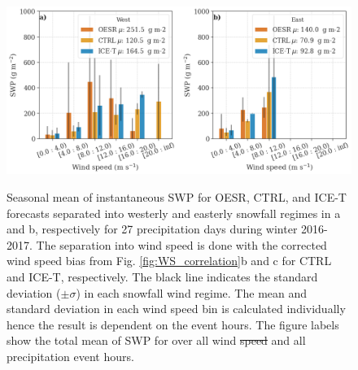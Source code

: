 \documentclass{ametsocV5}
\providecommand{\DIFadd}[1]{{\protect\color{blue}\uwave{#1}}} %
\providecommand{\DIFdel}[1]{{\protect\color{red}\sout{#1}}}                      %
\providecommand{\DIFaddbegin}{} %
\providecommand{\DIFaddend}{} %
\providecommand{\DIFaddFL}[1]{\DIFadd{#1}} %
\providecommand{\DIFdelFL}[1]{\DIFdel{#1}} %
\providecommand{\DIFaddbeginFL}{} %
\providecommand{\DIFaddendFL}{} %
\providecommand{\DIFdelbeginFL}{} %
\providecommand{\DIFdelendFL}{} %
\newcommand{\DIFscaledelfig}{0.5}
\newlength{\DIFdelgraphicswidth} %
\newlength{\DIFdelgraphicsheight} %
\newcommand{\DIFaddincludegraphics}[2][]{{\color{blue}\fbox{\DIFOincludegraphics[#1]{#2}}}} %
\newcommand{\DIFdelincludegraphics}[2][]{%
\sbox{\DIFdelgraphicsbox}{\DIFOincludegraphics[#1]{#2}}%
\settoboxwidth{\DIFdelgraphicswidth}{\DIFdelgraphicsbox} %
\settoboxtotalheight{\DIFdelgraphicsheight}{\DIFdelgraphicsbox} %
\scalebox{\DIFscaledelfig}{%
\parbox[b]{\DIFdelgraphicswidth}{\usebox{\DIFdelgraphicsbox}\\[-\baselineskip] \rule{\DIFdelgraphicswidth}{0em}}\llap{\resizebox{\DIFdelgraphicswidth}{\DIFdelgraphicsheight}{%
\setlength{\unitlength}{\DIFdelgraphicswidth}%
\begin{picture}(1,1)%
\thicklines\linethickness{2pt} %
{\color[rgb]{1,0,0}\put(0,0){\framebox(1,1){}}}%
{\color[rgb]{1,0,0}\put(0,0){\line( 1,1){1}}}%
{\color[rgb]{1,0,0}\put(0,1){\line(1,-1){1}}}%
\end{picture}%
}\hspace*{3pt}}} %
} %
\DeclareRobustCommand{\DIFaddbegin}{\DIFOaddbegin \let\includegraphics\DIFaddincludegraphics} %
\DeclareRobustCommand{\DIFaddend}{\DIFOaddend \let\includegraphics\DIFOincludegraphics} %
\DeclareRobustCommand{\DIFaddbeginFL}{\DIFOaddbeginFL \let\includegraphics\DIFaddincludegraphics} %
\DeclareRobustCommand{\DIFaddendFL}{\DIFOaddendFL \let\includegraphics\DIFOincludegraphics} %
\DeclareRobustCommand{\DIFdelbeginFL}{\DIFOdelbeginFL \let\includegraphics\DIFdelincludegraphics} %
\DeclareRobustCommand{\DIFdelendFL}{\DIFOaddendFL \let\includegraphics\DIFOincludegraphics} %
\begin{document}
\begin{figure}
	\noindent\DIFdelbeginFL %
\DIFdelendFL \DIFaddbeginFL \includegraphics[width=\textwidth,angle=0]{fig10.png}\DIFaddendFL \\
	\caption{Seasonal mean of instantaneous SWP for OESR, CTRL, and ICE-T forecasts separated into westerly and easterly snowfall regimes in a and b, respectively for 27 precipitation days during winter 2016-2017. The separation into wind speed is done with the corrected wind speed bias from Fig. \ref{fig:WS_correlation}b and c for CTRL and ICE-T, respectively. The black line indicates the standard deviation ($\pm \sigma$) in each snowfall wind regime. The mean and standard deviation in each wind speed bin is calculated individually hence the result is dependent on the event hours. The figure labels show the total mean of SWP for over all wind \DIFdelbeginFL \DIFdelFL{speed }\DIFdelendFL \DIFaddbeginFL \DIFaddFL{speeds }\DIFaddendFL and all precipitation event hours. 
}
	\label{fig:swp_WS_WD}
\end{figure}
 \DIFaddbegin 


 \DIFaddend
\end{document}
